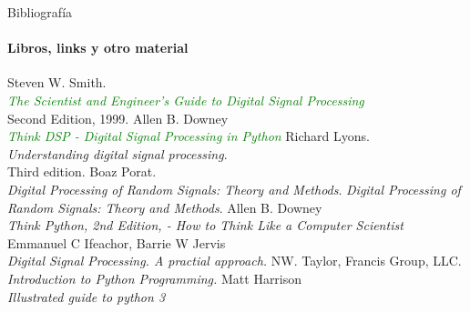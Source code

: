 \begin{frame}{Bibliografía}
    \framesubtitle{Libros, links y otro material}
    \tiny{
       \begin{thebibliography}{1}
             Steven W. Smith. \\
             \textcolor{green}{\emph{The Scientist and Engineer's Guide to Digital Signal Processing}} \\
             Second Edition, 1999.
             Allen B. Downey \\
             \textcolor{green}{\emph{Think DSP - Digital Signal Processing in Python}}
             Richard Lyons. \\
             \emph {Understanding digital signal processing}. \\
             Third edition.
             Boaz Porat. \\
            \emph{Digital Processing of Random Signals: Theory and Methods}.
             \emph{Digital Processing of Random Signals: Theory and Methods}.
             Allen B. Downey \\
             \emph{ Think Python, 2nd Edition, - How to Think Like a Computer Scientist}
             Emmanuel C Ifeachor, Barrie W Jervis \\
             \emph{ Digital Signal Processing. A practial approach.}
             NW. Taylor, Francis Group, LLC.\\
             \emph{ Introduction to Python Programming.}
             Matt Harrison\\
             \emph{ Illustrated guide to python 3}
       \end{thebibliography}
   }
\end{frame}

